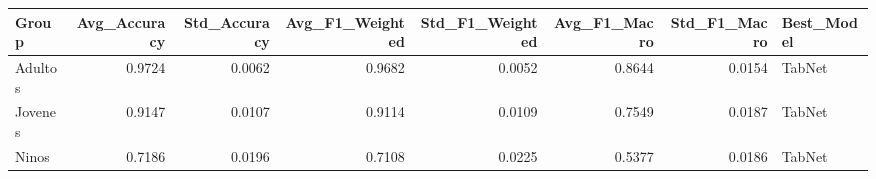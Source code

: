 \begin{tabular}{lrrrrrrl}
\toprule
Group & Avg_Accuracy & Std_Accuracy & Avg_F1_Weighted & Std_F1_Weighted & Avg_F1_Macro & Std_F1_Macro & Best_Model \\
\midrule
Adultos & 0.9724 & 0.0062 & 0.9682 & 0.0052 & 0.8644 & 0.0154 & TabNet \\
Jovenes & 0.9147 & 0.0107 & 0.9114 & 0.0109 & 0.7549 & 0.0187 & TabNet \\
Ninos & 0.7186 & 0.0196 & 0.7108 & 0.0225 & 0.5377 & 0.0186 & TabNet \\
\bottomrule
\end{tabular}
